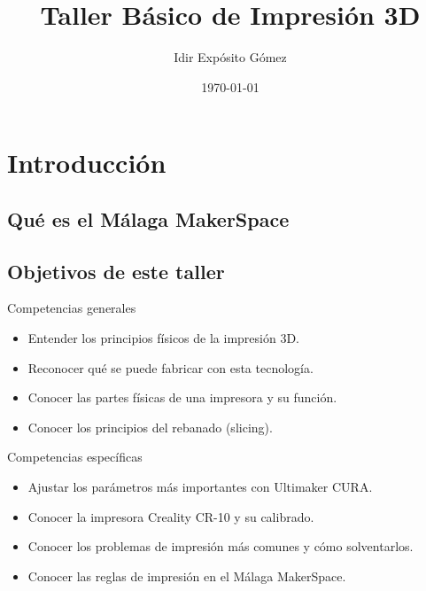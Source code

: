 \documentclass{beamer}
\title{Taller Básico de Impresión 3D}
\date{\today}
\author{Idir Expósito Gómez}
\institute{Málaga MakerSpace}
\begin{document}
	\maketitle
	
	\section{Introducción}
	
	\subsection{Qué es el Málaga MakerSpace}
	
	\subsection{Objetivos de este taller}
	\begin{frame}{Competencias generales}
		\begin{itemize}
			\item Entender los principios físicos de la impresión 3D.
			\item Reconocer qué se puede fabricar con esta tecnología.
			\item Conocer las partes físicas de una impresora y su función.
			\item Conocer los principios del rebanado (slicing).
		\end{itemize}
	\end{frame}
	\begin{frame}{Competencias específicas}
		\begin{itemize}
			\item Ajustar los parámetros más importantes con Ultimaker CURA.
			\item Conocer la impresora Creality CR-10 y su calibrado.
			\item Conocer los problemas de impresión más comunes y cómo solventarlos.
			\item Conocer las reglas de impresión en el Málaga MakerSpace.
		\end{itemize}
	\end{frame}
	
\end{document}
